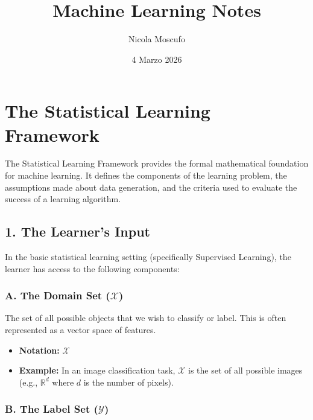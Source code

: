 \documentclass[
  italian,
  11pt,
]{article}
\title{Machine Learning Notes}
\author{Nicola Moscufo}
\date{4 Marzo 2026}
\providecommand{\tightlist}{%
  \setlength{\itemsep}{0pt}\setlength{\parskip}{0pt}}
\begin{document}
\maketitle

{
\hypersetup{linkcolor=Black}
\setcounter{tocdepth}{3}
\tableofcontents
}
\newpage

\section{The Statistical Learning
Framework}\label{the-statistical-learning-framework}

The Statistical Learning Framework provides the formal mathematical
foundation for machine learning. It defines the components of the
learning problem, the assumptions made about data generation, and the
criteria used to evaluate the success of a learning algorithm.

\subsection{1. The Learner's Input}\label{the-learners-input}

In the basic statistical learning setting (specifically Supervised
Learning), the learner has access to the following components:

\subsubsection{\texorpdfstring{A. The Domain Set
(\(\mathcal{X}\))}{A. The Domain Set (\textbackslash mathcal\{X\})}}\label{a.-the-domain-set-mathcalx}

The set of all possible objects that we wish to classify or label. This
is often represented as a vector space of features.

\begin{itemize}
\tightlist
\item
  \textbf{Notation:} \(\mathcal{X}\)
\item
  \textbf{Example:} In an image classification task, \(\mathcal{X}\) is
  the set of all possible images (e.g., \(\mathbb{R}^{d}\) where \(d\)
  is the number of pixels).
\end{itemize}

\subsubsection{\texorpdfstring{B. The Label Set
(\(\mathcal{Y}\))}{B. The Label Set (\textbackslash mathcal\{Y\})}}\label{b.-the-label-set-mathcaly}
\end{document}
